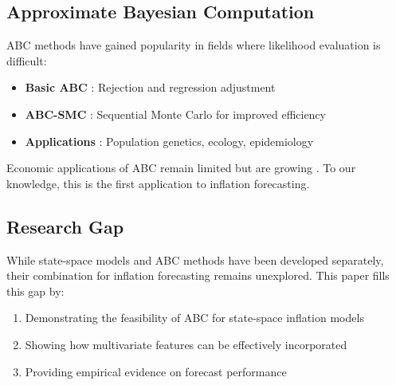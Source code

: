 \subsection{Approximate Bayesian Computation}

ABC methods have gained popularity in fields where likelihood evaluation is difficult:

\begin{itemize}
    \item \textbf{Basic ABC} \citep{tavare1997, beaumont2002}: Rejection and regression adjustment
    \item \textbf{ABC-SMC} \citep{sisson2007, toni2009}: Sequential Monte Carlo for improved efficiency
    \item \textbf{Applications} \citep{marin2012, sisson2018}: Population genetics, ecology, epidemiology
\end{itemize}

Economic applications of ABC remain limited but are growing \citep{forneron2018, hansen2020}. To our knowledge, this is the first application to inflation forecasting.

\subsection{Research Gap}

While state-space models and ABC methods have been developed separately, their combination for inflation forecasting remains unexplored. This paper fills this gap by:

\begin{enumerate}
    \item Demonstrating the feasibility of ABC for state-space inflation models
    \item Showing how multivariate features can be effectively incorporated
    \item Providing empirical evidence on forecast performance
\end{enumerate}
